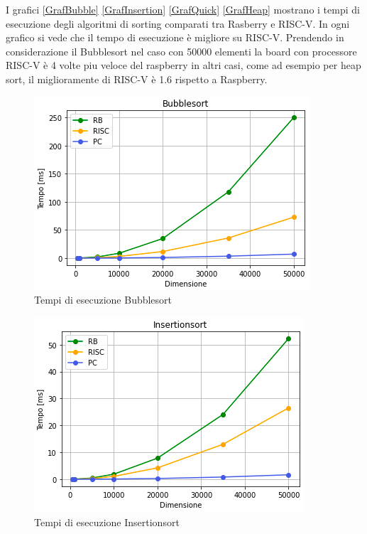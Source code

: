 \documentclass[12pt, a4paper]{report}
\begin{document}
I grafici \ref{GrafBubble} \ref{GrafInsertion} \ref{GrafQuick} \ref{GrafHeap} mostrano i tempi di esecuzione degli algoritmi di sorting comparati tra Rasberry e RISC-V. In ogni grafico si vede che il tempo di esecuzione è migliore su RISC-V. Prendendo in considerazione il Bubblesort nel caso con 50000 elementi la board con processore RISC-V è 4 volte piu veloce del raspberry in altri casi, come ad esempio per heap sort, il miglioramente di RISC-V è 1.6 rispetto a Raspberry. 


\begin{figure}[ht]
\centering
 \includegraphics[scale=0.8]{Img/GraficiSorting/Bubblesort_All.PNG}
 \caption{Tempi di esecuzione Bubblesort}
\end{figure}

\begin{figure}[ht]
\centering
 \includegraphics[scale=0.8]{Img/GraficiSorting/Insertionsort_All.PNG}
 \caption{Tempi di esecuzione Insertionsort}
\end{figure}
	
\end{document}
